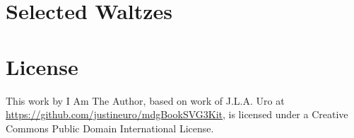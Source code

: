\documentclass[a4paper,x11names,svgnames,10pt]{article}
\begin{document}
\newpage
\section{Selected Waltzes}
\vspace{0.80in}
{
\small
\topmargin -1.00in
\textheight 10.25in
	
}	

\section{License}
This work by I Am The Author, based on work of J.L.A. Uro at  \url{https://github.com/justineuro/mdgBookSVG3Kit}, is licensed under a Creative Commons Public Domain International License.




 
\end{document}
